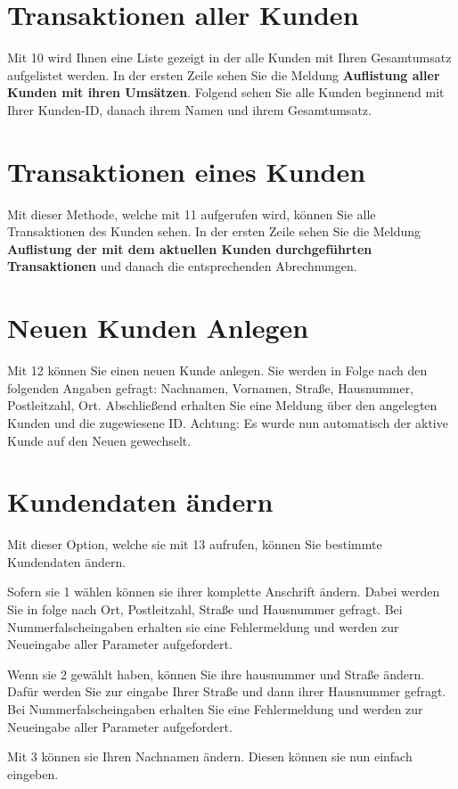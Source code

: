 ﻿\documentclass[a4paper,12pt,titlepage]{article}
\newcommand\enquote[1]{{\ttfamily \bfseries #1}}
\begin{document}
\section{Transaktionen aller Kunden}
Mit 10 wird Ihnen eine Liste  gezeigt in der alle Kunden mit Ihren Gesamtumsatz aufgelistet werden.
In der ersten Zeile sehen Sie die Meldung \enquote{Auflistung aller Kunden mit ihren Umsätzen}.
Folgend sehen Sie alle Kunden beginnend mit Ihrer Kunden-ID, danach ihrem Namen und ihrem Gesamtumsatz.

\section{Transaktionen eines Kunden}
Mit dieser Methode, welche mit 11 aufgerufen wird, können Sie alle Transaktionen des Kunden sehen.
In der ersten Zeile sehen Sie die Meldung \enquote{Auflistung der mit dem aktuellen Kunden durchgeführten Transaktionen}
 und danach die entsprechenden Abrechnungen.

\section{Neuen Kunden Anlegen}
Mit 12 können Sie einen neuen Kunde anlegen.
Sie werden in Folge nach den folgenden Angaben gefragt: Nachnamen,  Vornamen,  Straße,  Hausnummer, Postleitzahl, Ort.
Abschließend erhalten Sie eine Meldung über den angelegten Kunden und die zugewiesene ID.
Achtung: Es wurde nun automatisch der aktive Kunde auf den Neuen gewechselt.

\section{Kundendaten ändern}
Mit dieser Option, welche sie mit 13 aufrufen, können Sie bestimmte Kundendaten ändern.

Sofern sie 1 wählen können sie ihrer komplette Anschrift ändern.
Dabei werden Sie in folge nach Ort, Postleitzahl, Straße und Hausnummer gefragt.
Bei Nummerfalscheingaben erhalten sie eine Fehlermeldung und werden zur Neueingabe aller Parameter aufgefordert.

Wenn sie 2 gewählt haben, können Sie ihre hausnummer und Straße ändern.
Dafür werden Sie zur eingabe Ihrer Straße und dann ihrer Hausnummer gefragt.
Bei Nummerfalscheingaben erhalten Sie eine Fehlermeldung und werden zur Neueingabe aller Parameter aufgefordert.

Mit 3 können sie Ihren Nachnamen ändern. Diesen können sie nun einfach eingeben.
\end{document}

